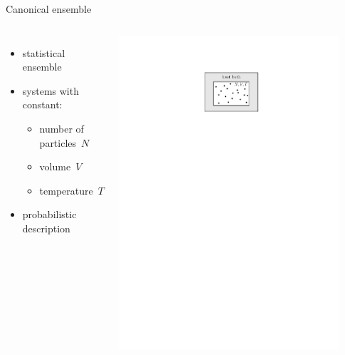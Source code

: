\documentclass[mathserif,serif]{beamer}
\begin{document}
\begin{frame}{Canonical ensemble}
	\begin{columns}
			\begin{itemize}
				\setlength\itemsep{1.0em}
				\item statistical ensemble
				\item systems with constant:
				\begin{itemize}
					\item number of particles~$N$
					\item volume~$V$
					\item temperature~$T$
				\end{itemize}
				
				\item probabilistic description
			\end{itemize}
		
			
			\centering
			\includegraphics[width=0.9\textwidth]{./figures/canonical_ensemble.pdf}
		
	\end{columns}
\end{frame}
\end{document}
